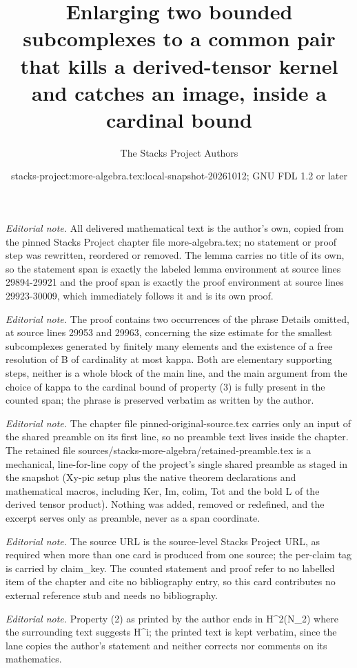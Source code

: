 \documentclass[10pt,a4paper]{amsart}
\title{Enlarging two bounded subcomplexes to a common pair that kills a derived-tensor kernel and catches an image, inside a cardinal bound}
\author{The Stacks Project Authors}
\date{stacks-project:more-algebra.tex:local-snapshot-20261012; GNU FDL 1.2 or later}
\theoremstyle{plain}
\theoremstyle{definition}
\theoremstyle{remark}
\numberwithin{equation}{subsection}
\begin{document}
\maketitle
\setcounter{subsection}{1}
\noindent\textit{Editorial note.} All delivered mathematical text is the author's own, copied from the pinned Stacks Project chapter file more-algebra.tex; no statement or proof step was rewritten, reordered or removed. The lemma carries no title of its own, so the statement span is exactly the labeled lemma environment at source lines 29894-29921 and the proof span is exactly the proof environment at source lines 29923-30009, which immediately follows it and is its own proof.\par\medskip
\noindent\textit{Editorial note.} The proof contains two occurrences of the phrase Details omitted, at source lines 29953 and 29963, concerning the size estimate for the smallest subcomplexes generated by finitely many elements and the existence of a free resolution of B of cardinality at most kappa. Both are elementary supporting steps, neither is a whole block of the main line, and the main argument from the choice of kappa to the cardinal bound of property (3) is fully present in the counted span; the phrase is preserved verbatim as written by the author.\par\medskip
\noindent\textit{Editorial note.} The chapter file pinned-original-source.tex carries only an input of the shared preamble on its first line, so no preamble text lives inside the chapter. The retained file sources/stacks-more-algebra/retained-preamble.tex is a mechanical, line-for-line copy of the project's single shared preamble as staged in the snapshot (Xy-pic setup plus the native theorem declarations and mathematical macros, including Ker, Im, colim, Tot and the bold L of the derived tensor product). Nothing was added, removed or redefined, and the excerpt serves only as preamble, never as a span coordinate.\par\medskip
\noindent\textit{Editorial note.} The source URL is the source-level Stacks Project URL, as required when more than one card is produced from one source; the per-claim tag is carried by claim\_key. The counted statement and proof refer to no labelled item of the chapter and cite no bibliography entry, so this card contributes no external reference stub and needs no bibliography.\par\medskip
\noindent\textit{Editorial note.} Property (2) as printed by the author ends in H\textasciicircum{}2(N\_2) where the surrounding text suggests H\textasciicircum{}i; the printed text is kept verbatim, since the lane copies the author's statement and neither corrects nor comments on its mathematics.\par\medskip
\end{document}
